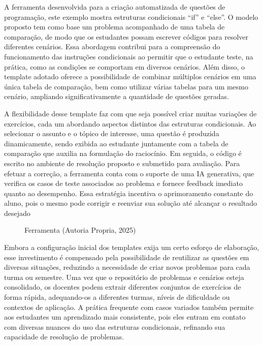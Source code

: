 A ferramenta desenvolvida para a criação automatizada de questões de programação, este exemplo mostra estruturas condicionais “if” e “else”. O modelo proposto  tem como base um problema acompanhado de uma tabela de comparação, de modo que os estudantes possam escrever códigos para resolver diferentes cenários. Essa abordagem contribui para a compreensão do funcionamento das instruções condicionais ao permitir que o estudante teste, na prática, como as condições se comportam em diversos cenários. Além disso, o template adotado oferece a possibilidade de combinar múltiplos cenários em uma única tabela de comparação, bem como utilizar várias tabelas para um mesmo cenário, ampliando significativamente a quantidade de questões geradas. 

A flexibilidade desse template faz com que seja possível criar muitas variações de exercícios, cada um abordando aspectos distintos das estruturas condicionais. Ao selecionar o assunto e o tópico de interesse, uma questão é produzida dinamicamente, sendo exibida ao estudante juntamente com a tabela de comparação que auxilia na formulação do raciocínio. Em seguida, o código é escrito no ambiente de resolução proposto e submetido para avaliação. Para efetuar a correção, a ferramenta conta com o suporte de uma IA generativa, que verifica os casos de teste associados ao problema e fornece feedback imediato quanto ao desempenho. Essa estratégia incentiva o aprimoramento constante do aluno, pois o mesmo pode corrigir e reenviar sua solução até alcançar o resultado desejado 
\begin{figure}[ht]
	\centering
	\caption{Ferramenta (Autoria Propria, 2025) }
	\label{fig:ferramenta}
\end{figure}



Embora a configuração inicial dos templates exija um certo esforço de elaboração, esse investimento é compensado pela possibilidade de reutilizar as questões em diversas situações, reduzindo a necessidade de criar novos problemas para cada turma ou semestre. Uma vez que o repositório de problemas e cenários esteja consolidado, os docentes podem extrair diferentes conjuntos de exercícios de forma rápida, adequando-os a diferentes turmas, níveis de dificuldade ou contextos de aplicação. A prática frequente com casos variados também permite aos estudantes um aprendizado mais consistente, pois eles entram em contato com diversas nuances do uso das estruturas condicionais, refinando sua capacidade de resolução de problemas.

